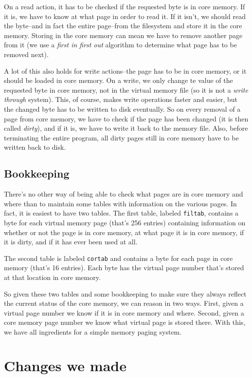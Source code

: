 \documentclass[11pt]{article}
\begin{document}
On a read action, it has to be checked if the requested byte is in core memory. If it is, we have to know at what page in order to read it. If it isn't, we should read the byte--and in fact the entire page--from the filesystem and store it in the core memory. Storing in the core memory can mean we have to remove another page from it (we use a \emph{first in first out} algorithm to determine what page has to be removed next).

A lot of this also holds for write actions--the page has to be in core memory, or it should be loaded in core memory. On a write, we only change te value of the requested byte in core memory, not in the virtual memory file (so it is not a \emph{write through} system). This, of course, makes write operations faster and easier, but the changed byte has to be written to disk eventually. So on every removal of a page from core memory, we have to check if the page has been changed (it is then called \emph{dirty}), and if it is, we have to write it back to the memory file. Also, before terminating the entire program, all dirty pages still in core memory have to be written back to disk.

\subsection{Bookkeeping}

There's no other way of being able to check what pages are in core memory and where than to maintain some tables with information on the various pages. In fact, it is easiest to have two tables. The first table, labeled \verb|filtab|, contains a byte for each virtual memory page (that's 256 entries) containing information on whether or not the page is in core memory, at what page it is in core memory, if it is dirty, and if it has ever been used at all.

The second table is labeled \verb|cortab| and contains a byte for each page in core memory (that's 16 entries). Each byte has the virtual page number that's stored at that location in core memory.

So given these two tables and some bookkeeping to make sure they always reflect the current status of the core memory, we can reason in two ways. First, given a virtual page number we know if it is in core memory and where. Second, given a core memory page number we know what virtual page is stored there. With this, we have all ingredients for a simple memory paging system.


\section{Changes we made}
\end{document}
